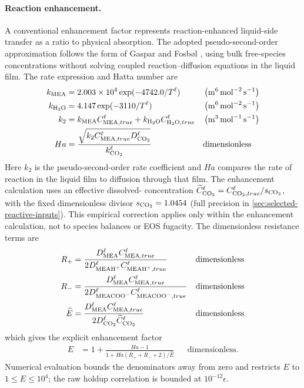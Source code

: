 \paragraph{Reaction enhancement.}
A conventional enhancement factor represents reaction-enhanced liquid-side \COtwo{} transfer as a ratio to physical absorption.
The adopted pseudo-second-order approximation follows the form of Gaspar and Fosb\o l \cite{Gaspar2015}, using bulk free-species concentrations without solving coupled reaction--diffusion equations in the liquid film.
The rate expression and Hatta number are
\begin{align}
k_{\MEA} &= 2.003\times10^4\exp(-4742.0/T^{\liq})
&& \left(\unit{m^6\,mol^{-2}\,s^{-1}}\right)\\
k_{\HtwoO} &= 4.147\exp(-3110/T^{\liq})
&& \left(\unit{m^6\,mol^{-2}\,s^{-1}}\right)\\
k_2 &= k_{\MEA}C^{\liq}_{\MEA,true}+k_{\HtwoO}C^{\liq}_{\HtwoO,true}
&& \left(\unit{m^3\,mol^{-1}\,s^{-1}}\right)\\
Ha &= \frac{\sqrt{k_2 C^{\liq}_{\MEA,true} D^{\liq}_{\COtwo}}}{k^{\liq}_{\COtwo}}
&& \text{dimensionless}
\end{align}
Here $k_2$ is the pseudo-second-order rate coefficient and $Ha$ compares the rate of reaction in the liquid film to diffusion through that film.
The enhancement calculation uses an effective dissolved-\COtwo{} concentration
$\widetilde C^{\liq}_{\COtwo}=C^{\liq}_{\COtwo,true}/s_{\COtwo}$, with the fixed dimensionless divisor
$s_{\COtwo}=1.0454$ (full precision in \cref{sec:selected-reactive-inputs}).
This empirical correction applies only within the enhancement calculation, not to species balances or EOS fugacity.
The dimensionless resistance terms are
\begin{align}
R_+ &= \frac{D^{\liq}_{\MEA} C^{\liq}_{\MEA,true}}
{2D^{\liq}_{\MEAH} C^{\liq}_{\MEAH,true}}
&& \text{dimensionless}\\
R_- &= \frac{D^{\liq}_{\MEA} C^{\liq}_{\MEA,true}}
{2D^{\liq}_{\MEACOO} C^{\liq}_{\MEACOO,true}}
&& \text{dimensionless}\\
\widehat{E} &= \frac{D^{\liq}_{\MEA} C^{\liq}_{\MEA,true}}
{2D^{\liq}_{\COtwo} \widetilde C^{\liq}_{\COtwo}}
&& \text{dimensionless}
\end{align}
which gives the explicit enhancement factor
\begin{align}
E &= 1+\frac{Ha-1}{1 + Ha(R_+ + R_- + 2)/\widehat{E}}
&& \text{dimensionless}.
\end{align}
Numerical evaluation bounds the denominators away from zero and restricts $E$ to $1\leq E\leq10^4$; the raw holdup correlation is bounded at \(10^{-12}\epsilon\).

